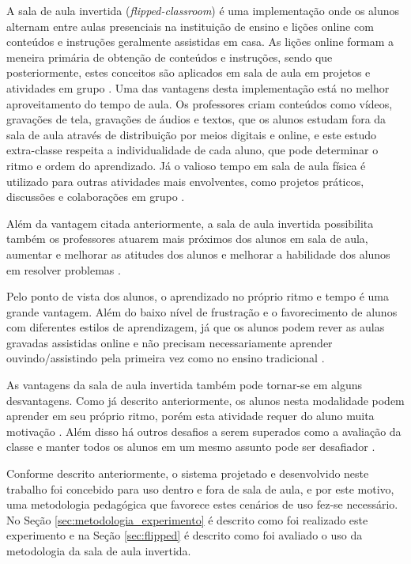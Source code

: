 A sala de aula invertida (\emph{flipped-classroom}) é uma implementação onde os alunos alternam entre aulas presenciais na instituição de ensino e lições online com conteúdos e instruções geralmente assistidas em casa. As lições online formam a meneira primária de obtenção de conteúdos e instruções, sendo que posteriormente, estes conceitos são aplicados em sala de aula em projetos e atividades em grupo \cite{staker_classifying_2012}. Uma das vantagens desta implementação está no melhor aproveitamento do tempo de aula. Os professores criam conteúdos como vídeos, gravações de tela, gravações de áudios e textos, que os alunos estudam fora da sala de aula através de distribuição por meios digitais e online, e este estudo extra-classe respeita a individualidade de cada aluno, que pode determinar o ritmo e ordem do aprendizado. Já o valioso tempo em sala de aula física é utilizado para outras atividades mais envolventes, como projetos práticos, discussões e colaborações em grupo \cite{milman_flipped_2012}.

Além da vantagem citada anteriormente, a sala de aula invertida possibilita também os professores atuarem mais próximos dos alunos em sala de aula, aumentar e melhorar as atitudes dos alunos e melhorar a habilidade dos alunos em resolver problemas \cite{fulton_10_2012}. 

Pelo ponto de vista dos alunos, o aprendizado no próprio ritmo e tempo é uma grande vantagem. Além do baixo nível de frustração e o favorecimento de alunos com diferentes estilos de aprendizagem, já que os alunos podem rever as aulas gravadas assistidas online e não precisam necessariamente aprender ouvindo/assistindo pela primeira vez como no ensino tradicional \cite{fulton_10_2012}.

As vantagens da sala de aula invertida também pode tornar-se em alguns desvantagens. Como já descrito anteriormente, os alunos nesta modalidade podem aprender em seu próprio ritmo, porém esta atividade requer do aluno muita motivação \cite{du_flipped_2014}. Além disso há outros desafios a serem superados como a avaliação da classe e manter todos os alunos em um mesmo assunto pode ser desafiador \cite{du_flipped_2014}.

Conforme descrito anteriormente, o sistema projetado e desenvolvido neste trabalho foi concebido para uso dentro e fora de sala de aula, e por este motivo, uma metodologia pedagógica que favorece estes cenários de uso fez-se necessário. No Seção \ref{sec:metodologia_experimento} é descrito como foi realizado este experimento e na Seção \ref{sec:flipped} é descrito como foi avaliado o uso da metodologia da sala de aula invertida.

